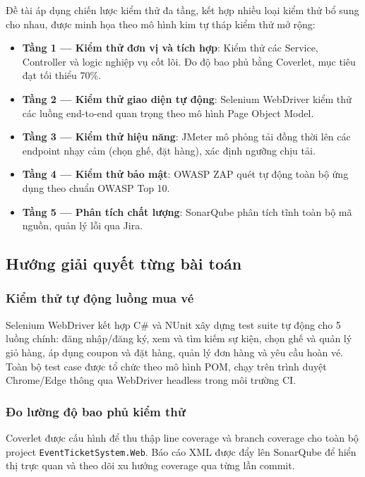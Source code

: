 \documentclass[../main.tex]{subfiles}
\begin{document}
Đề tài áp dụng chiến lược kiểm thử đa tầng, kết hợp nhiều loại kiểm thử bổ sung cho nhau, được minh họa theo mô hình kim tự tháp kiểm thử mở rộng:

\begin{itemize}
    \item \textbf{Tầng 1 — Kiểm thử đơn vị và tích hợp}: Kiểm thử các Service, Controller và logic nghiệp vụ cốt lõi. Đo độ bao phủ bằng Coverlet, mục tiêu đạt tối thiểu 70\%.
    \item \textbf{Tầng 2 — Kiểm thử giao diện tự động}: Selenium WebDriver kiểm thử các luồng end-to-end quan trọng theo mô hình Page Object Model.
    \item \textbf{Tầng 3 — Kiểm thử hiệu năng}: JMeter mô phỏng tải đồng thời lên các endpoint nhạy cảm (chọn ghế, đặt hàng), xác định ngưỡng chịu tải.
    \item \textbf{Tầng 4 — Kiểm thử bảo mật}: OWASP ZAP quét tự động toàn bộ ứng dụng theo chuẩn OWASP Top 10.
    \item \textbf{Tầng 5 — Phân tích chất lượng}: SonarQube phân tích tĩnh toàn bộ mã nguồn, quản lý lỗi qua Jira.
\end{itemize}

\subsection{Hướng giải quyết từng bài toán}

\subsubsection{Kiểm thử tự động luồng mua vé}

Selenium WebDriver kết hợp C\# và NUnit xây dựng test suite tự động cho 5 luồng chính: đăng nhập/đăng ký, xem và tìm kiếm sự kiện, chọn ghế và quản lý giỏ hàng, áp dụng coupon và đặt hàng, quản lý đơn hàng và yêu cầu hoàn vé. Toàn bộ test case được tổ chức theo mô hình POM, chạy trên trình duyệt Chrome/Edge thông qua WebDriver headless trong môi trường CI.

\subsubsection{Đo lường độ bao phủ kiểm thử}

Coverlet được cấu hình để thu thập line coverage và branch coverage cho toàn bộ project \texttt{EventTicketSystem.Web}. Báo cáo XML được đẩy lên SonarQube để hiển thị trực quan và theo dõi xu hướng coverage qua từng lần commit.
\end{document}
